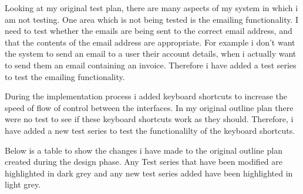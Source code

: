  Looking at my original test plan, there are many aspects of my system in which i am not testing. One area which is not being tested is the emailing functionality. I need to test whether the emails are being sent to the correct email address, and that the contents of the email address are appropriate. For example i don't want the system to send an email to a user their account details, when i actually want to send them an email containing an invoice. Therefore i have added a test series to test the emailing functionality. \par

During the implementation process i added keyboard shortcuts to increase the speed of flow of control between the interfaces. In my original outline plan there were no test to see if these keyboard shortcuts work as they should. Therefore, i have added a new test series to test the functionalilty of the keyboard shortcuts. \par

Below is a table to show the changes i have made to the original outline plan created during the design phase. Any Test series that have been modified are highlighted in dark grey  and any new test series added have been highlighted in light grey.

